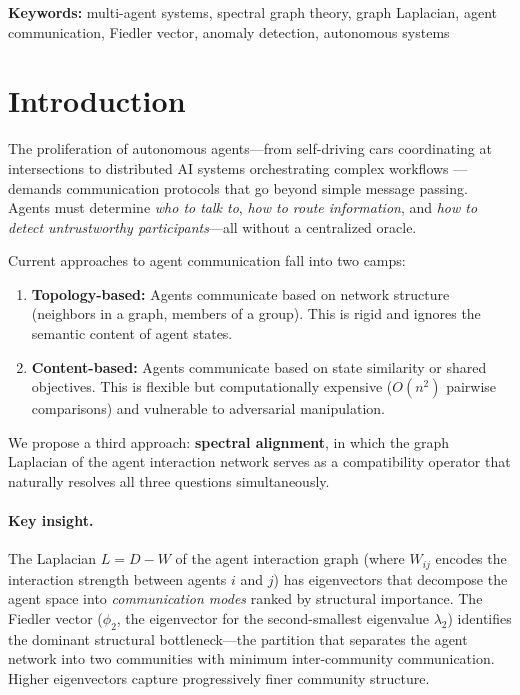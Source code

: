 \documentclass[11pt,a4paper]{article}
\begin{document}
\medskip
\noindent\textbf{Keywords:} multi-agent systems, spectral graph theory, graph Laplacian,
agent communication, Fiedler vector, anomaly detection, autonomous systems

\newpage
\tableofcontents
\newpage

\section{Introduction}
\label{sec:intro}

The proliferation of autonomous agents---from self-driving cars coordinating
at intersections \citep{cao2012autonomous} to distributed AI systems
orchestrating complex workflows \citep{park2023generative}---demands
communication protocols that go beyond simple message passing.  Agents must
determine \emph{who to talk to}, \emph{how to route information}, and
\emph{how to detect untrustworthy participants}---all without a centralized
oracle.

Current approaches to agent communication fall into two camps:
\begin{enumerate}
  \item \textbf{Topology-based:} Agents communicate based on network structure
        (neighbors in a graph, members of a group).  This is rigid and ignores
        the semantic content of agent states.
  \item \textbf{Content-based:} Agents communicate based on state similarity
        or shared objectives.  This is flexible but computationally expensive
        ($O(n^2)$ pairwise comparisons) and vulnerable to adversarial
        manipulation.
\end{enumerate}

We propose a third approach: \textbf{spectral alignment}, in which the graph
Laplacian of the agent interaction network serves as a compatibility operator
that naturally resolves all three questions simultaneously.

\paragraph{Key insight.}
The Laplacian $L = D - W$ of the agent interaction graph (where $W_{ij}$
encodes the interaction strength between agents $i$ and $j$) has eigenvectors
that decompose the agent space into \emph{communication modes} ranked by
structural importance.  The Fiedler vector ($\phi_2$, the eigenvector for the
second-smallest eigenvalue $\lambda_2$) identifies the dominant structural
bottleneck---the partition that separates the agent network into two communities
with minimum inter-community communication.  Higher eigenvectors capture
progressively finer community structure.
\end{document}
